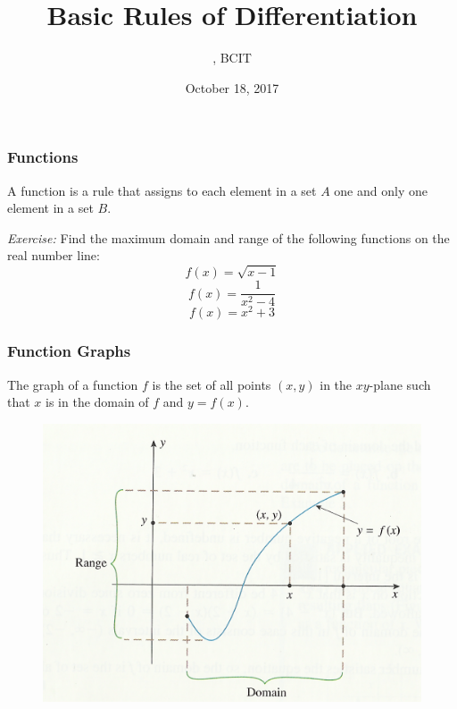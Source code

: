 \documentclass[xcolor=dvipsnames]{beamer}
\title{Basic Rules of Differentiation}
\subtitle{{\CourseNumber}, BCIT}
\author{\CourseName}
\date{October 18, 2017}
\begin{document}
\begin{frame}
  \titlepage
\end{frame}

\begin{frame}
  \frametitle{Functions}
A \alert{function} is a rule that assigns to each element in a set $A$ one and
only one element in a set $B$.

\medskip

\emph{Exercise:} Find the maximum domain and range of the following
functions on the real number line:
\begin{equation}
  \label{eq:sijoomai}
  f(x)=\sqrt{x-1}
\end{equation}
\begin{equation}
  \label{eq:vooghahk}
  f(x)=\frac{1}{x^{2}-4}
\end{equation}
\begin{equation}
  \label{eq:zaekohxi}
  f(x)=x^{2}+3
\end{equation}
\end{frame}

\begin{frame}
  \frametitle{Function Graphs}
The \alert{graph of a function} $f$ is the set of all points $(x,y)$
in the $xy$-plane such that $x$ is in the domain of $f$ and $y=f(x)$.
  \begin{figure}[h]
    \includegraphics[scale=1]{./fgraph-02.png}
  \end{figure}
\end{frame}
\end{document}
